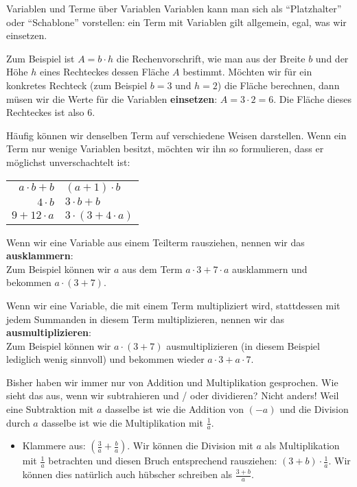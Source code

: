 \documentclass[../../main.tex]{subfiles}
\begin{document}
	\begin{nutshell}{Variablen und Terme über Variablen}
		Variablen kann man sich als \enquote{Platzhalter} oder \enquote{Schablone} vorstellen: ein Term mit Variablen gilt allgemein, egal, was wir einsetzen.

		Zum Beispiel ist $A = b\cdot h$ die Rechenvorschrift, wie man aus der Breite $b$ und der Höhe $h$ eines Rechteckes dessen Fläche $A$ bestimmt.
		Möchten wir für ein konkretes Rechteck (zum Beispiel $b=3$ und $h=2$) die Fläche berechnen, dann müsen wir die Werte für die Variablen \textbf{einsetzen}:
		$A = 3\cdot 2 = 6$. Die Fläche dieses Rechteckes ist also $6$.

		Häufig können wir denselben Term auf verschiedene Weisen darstellen. Wenn ein Term nur wenige Variablen besitzt, möchten wir ihn so formulieren,
		dass er möglichst unverschachtelt ist:
		\begin{center}
			\begin{tabular}{r@{ statt }l}
				$a\cdot b + b$ & $(a+1)\cdot b$\\
				$4\cdot b$ & $3\cdot b + b$\\
				$9+12\cdot a$ & $3\cdot (3 + 4\cdot a)$
			\end{tabular}
		\end{center}

		Wenn wir eine Variable aus einem Teilterm rausziehen, nennen wir das \textbf{ausklammern}:\\
		Zum Beispiel können wir $a$ aus dem Term $a\cdot 3+7\cdot a$ ausklammern und bekommen $a\cdot(3+7)$.

		Wenn wir eine Variable, die mit einem Term multipliziert wird, stattdessen mit jedem Summanden in diesem Term multiplizieren, nennen wir das \textbf{ausmultiplizieren}:\\
		Zum Beispiel können wir $a\cdot (3+7)$ ausmultiplizieren (in diesem Beispiel lediglich wenig sinnvoll) und bekommen wieder $a\cdot 3+ a\cdot 7$.
	\end{nutshell}

	Bisher haben wir immer nur von Addition und Multiplikation gesprochen. Wie sieht das aus, wenn wir subtrahieren und / oder dividieren?
	Nicht anders! Weil eine Subtraktion mit $a$ dasselbe ist wie die Addition von $(-a)$ und die Division durch $a$ dasselbe ist wie die Multiplikation mit $\frac{1}{a}$.
	\begin{example}
		\begin{itemize}
			\item Klammere aus: $\left(\frac{3}{a}+\frac{b}{a}\right)$. Wir können die Division mit $a$ als Multiplikation mit $\frac{1}{a}$ betrachten und diesen Bruch entsprechend rausziehen:
			$(3+b)\cdot \frac{1}{a}$. Wir können dies natürlich auch hübscher schreiben als $\frac{3+b}{a}$.
		\end{itemize}
	\end{example}
\end{document}
